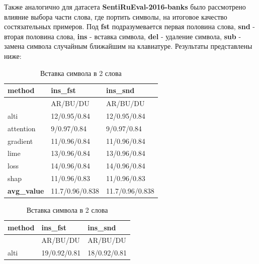 \noindent\hspace{0.6cm}Также аналогично для датасета \textbf{SentiRuEval-2016-banks} было рассмотрено влияние выбора части слова, где портить символы, на итоговое качество состязательных примеров. Под \textbf{fst} подразумевается первая половина слова, \textbf{snd} - вторая половина слова, \textbf{ins} - вставка символа, \textbf{del} - удаление символа, \textbf{sub} - замена символа случайным ближайшим на клавиатуре. Результаты представлены ниже:

\begin{table}[H]
  \centering
  \begin{minipage}[t]{0.49\textwidth} %
    \centering
    \caption{Вставка символа в 1 слово}
    {\fontsize{9pt}{15pt}\selectfont
    \begin{tabularx}{\textwidth}{|l|X|X|}
        \hline
         method    & ins\_fst          & ins\_snd          \\
        \hline
         & AR/BU/DU & AR/BU/DU  \\
        \hline
         alti      & 12/0.95/0.84 & 12/0.95/0.84 \\
        \hline
         attention & 9/0.97/0.84  & 9/0.97/0.84  \\
        \hline
         gradient  & 11/0.96/0.84 & 11/0.96/0.84 \\
        \hline
         lime      & 13/0.96/0.84 & 13/0.96/0.84 \\
        \hline
         loss      & 14/0.96/0.84 & 14/0.96/0.84 \\
        \hline
         shap      & 11/0.96/0.83 & 11/0.96/0.83 \\
        \hline
         \textbf{avg\_value} & 11.7/0.96/0.838 & 11.7/0.96/0.838 \\
        \hline
    \end{tabularx}
    }
  \end{minipage}
  \hfill %
  \begin{minipage}[t]{0.49\textwidth} %
    \centering
    \caption{Вставка символа в 2 слова}
    {\fontsize{9pt}{15pt}\selectfont
    \begin{tabularx}{\textwidth}{|l|X|X|}
        \hline
         method    & ins\_fst          & ins\_snd          \\
        \hline
         & AR/BU/DU & AR/BU/DU  \\
        \hline
         alti      & 19/0.92/0.81 & 18/0.92/0.81 \\

\end{tabularx}}
\end{minipage}
\end{table}
